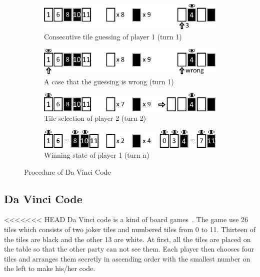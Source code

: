 \documentclass[conference]{IEEEtran}
\begin{document}
\begin{figure}
\begin{subfigure}[b]{0.95\columnwidth}
\label{fig:DVC_procedure_5}
\end{subfigure}
\par\smallskip
\begin{subfigure}[b]{0.95\columnwidth}
\includegraphics[width=0.95\columnwidth]{figures/DVC_procedure_6.pdf}
\caption{Consecutive tile guessing of player 1 (turn 1)}
\label{fig:DVC_procedure_6}
\end{subfigure}
\par\smallskip
\begin{subfigure}[b]{0.95\columnwidth}
\includegraphics[width=0.95\columnwidth]{figures/DVC_procedure_7.pdf}
\caption{A case that the guessing is wrong (turn 1)}
\label{fig:DVC_procedure_7}
\end{subfigure}
\par\smallskip
\begin{subfigure}[b]{0.95\columnwidth}
\includegraphics[width=0.95\columnwidth]{figures/DVC_procedure_8.pdf}
\caption{Tile selection of player 2 (turn 2)}
\label{fig:DVC_procedure_8}
\end{subfigure}
\par\smallskip
\begin{subfigure}[b]{0.95\columnwidth}
\includegraphics[width=0.95\columnwidth]{figures/DVC_procedure_9.pdf}
\caption{Winning state of player 1 (turn n)}
\label{fig:DVC_procedure_9}
\end{subfigure}
\caption{Procedure of Da Vinci Code}
\end{figure}

\subsection{Da Vinci Code} \label{sec:davinci}
<<<<<<< HEAD
Da Vinci code is a kind of board games~\cite{davinci_code}. 
The game use 26 tiles which consists of two joker tiles and numbered tiles from 0 to 11. 
Thirteen of the tiles are black and the other 13 are white.
At first, all the tiles are placed on the table so that the other party can not see them.
Each player then chooses four tiles and arranges them secretly in ascending order with the smallest number on the left to make his/her code. 
\end{document}
